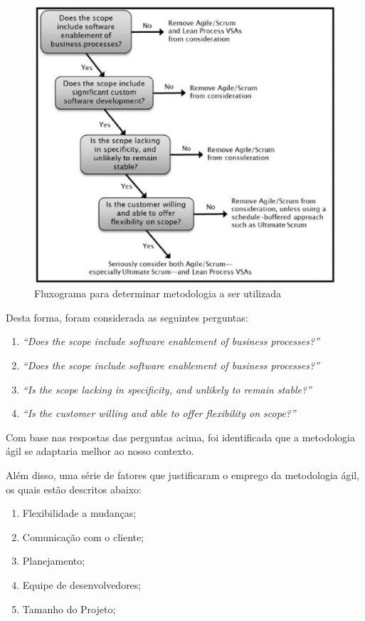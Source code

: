 \begin{figure}[h]
	\centering
	\label{fig01}
		\includegraphics[keepaspectratio=true,scale=0.6]{figuras/fluxograma1.eps}
	\caption{Fluxograma para determinar metodologia a ser utilizada}
\end{figure}


\tab Desta forma, foram considerada as seguintes perguntas: \\

\begin{enumerate}
	\item \textsl{“Does the scope include software enablement of business processes?”} 
	\item \textsl{“Does the scope include software enablement of business processes?”}
	\item \textsl{“Is the scope lacking in specificity, and unlikely to remain stable?”} 
	\item \textsl{“Is the customer willing and able to offer flexibility on scope?”} 
\end{enumerate}

\tab Com base nas respostas das perguntas acima, foi identificada que a metodologia ágil se adaptaria melhor ao nosso contexto.  

\tab Além disso, uma série de fatores que justificaram o emprego da metodologia ágil, os quais estão descritos abaixo:

\begin{enumerate}
	\item {Flexibilidade a mudanças;} 
	\item {Comunicação com o cliente;}
	\item {Planejamento;} 
	\item {Equipe de desenvolvedores;}
	\item {Tamanho do Projeto;}
\end{enumerate}



